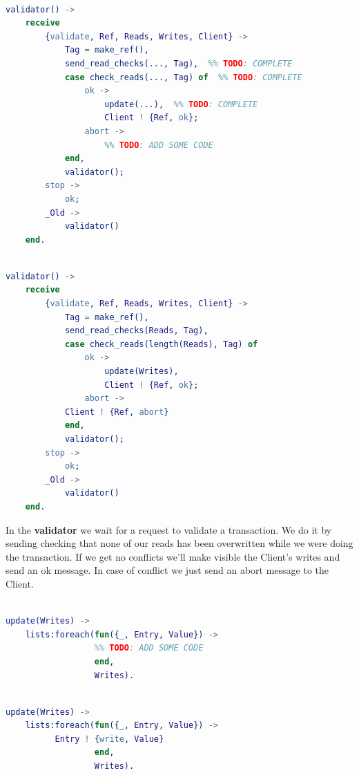 \documentclass[a4paper, 10pt]{article}
\begin{document}
\begin{minipage}{.45\textwidth}
	\begin{lstlisting}[language=erlang, caption={Template}]

validator() ->
    receive
        {validate, Ref, Reads, Writes, Client} ->
            Tag = make_ref(),
            send_read_checks(..., Tag),  %% TODO: COMPLETE
            case check_reads(..., Tag) of  %% TODO: COMPLETE
                ok ->
                    update(...),  %% TODO: COMPLETE
                    Client ! {Ref, ok};
                abort ->
                    %% TODO: ADD SOME CODE
            end,
            validator();
        stop ->
            ok;
        _Old ->
            validator()
    end.
 	\end{lstlisting}
    \end{minipage}\hfill
    \begin{minipage}{.45\textwidth}
	\begin{lstlisting}[language=erlang, caption={Filled version}]

validator() ->
    receive
        {validate, Ref, Reads, Writes, Client} ->
            Tag = make_ref(),
            send_read_checks(Reads, Tag),  
            case check_reads(length(Reads), Tag) of  
                ok ->
                    update(Writes),
                    Client ! {Ref, ok};
                abort ->
		    Client ! {Ref, abort}
            end,
            validator();
        stop ->
            ok;
        _Old ->
            validator()
    end.
  	\end{lstlisting}
  \end{minipage}


In the \textbf{validator} we wait for a request to validate a transaction. We do it by sending checking that none of our reads has been overwritten while we were doing the transaction. If we get no conflicts we'll make visible the Client's writes and send an ok message. In case of conflict we just send an abort message to the Client.


\begin{minipage}{.45\textwidth}
	\begin{lstlisting}[language=erlang, caption={Template}]

update(Writes) ->
    lists:foreach(fun({_, Entry, Value}) -> 
                  %% TODO: ADD SOME CODE
                  end, 
                  Writes).
 	\end{lstlisting}
    \end{minipage}\hfill
    \begin{minipage}{.45\textwidth}
	\begin{lstlisting}[language=erlang, caption={Filled version}]

update(Writes) ->
    lists:foreach(fun({_, Entry, Value}) -> 
		  Entry ! {write, Value}
                  end, 
                  Writes).
  	\end{lstlisting}
  \end{minipage}
\end{document}

